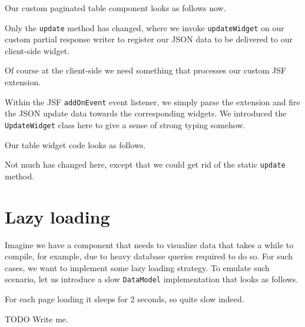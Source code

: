 Our custom paginated table component looks as follows now.

Only the \texttt{update} method has changed, where we invoke \texttt{updateWidget} on our custom partial response writer to register our JSON data to be delivered to our client-side widget.

Of course at the client-side we need something that processes our custom JSF extension.

Within the JSF \texttt{addOnEvent} event listener, we simply parse the extension and fire the JSON update data towards the corresponding widgets.
We introduced the \texttt{UpdateWidget} class here to give a sense of strong typing somehow.

Our table widget code looks as follows.

Not much has changed here, except that we could get rid of the static \texttt{update} method.

\section{Lazy loading}
Imagine we have a component that needs to visualize data that takes a while to compile, for example, due to heavy database queries required to do so.
For such cases, we want to implement some lazy loading strategy.
To emulate such scenario, let us introduce a slow \texttt{DataModel} implementation that looks as follows.

For each page loading it sleeps for 2 seconds, so quite slow indeed.


\begin{TODO}{TODO}
	Write me.
\end{TODO}
